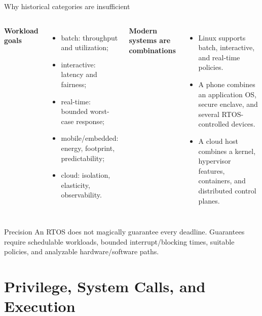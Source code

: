 \documentclass[aspectratio=169,11pt]{beamer}
\begin{document}
\begin{frame}{Why historical categories are insufficient}
  \begin{columns}[T,onlytextwidth]
      \textbf{Workload goals}
      \begin{itemize}
        \item batch: throughput and utilization;
        \item interactive: latency and fairness;
        \item real-time: bounded worst-case response;
        \item mobile/embedded: energy, footprint, predictability;
        \item cloud: isolation, elasticity, observability.
      \end{itemize}
      \textbf{Modern systems are combinations}
      \begin{itemize}
        \item Linux supports batch, interactive, and real-time policies.
        \item A phone combines an application OS, secure enclave, and several RTOS-controlled devices.
        \item A cloud host combines a kernel, hypervisor features, containers, and distributed control planes.
      \end{itemize}
  \end{columns}
  \begin{alertblock}{Precision}
    An RTOS does not magically guarantee every deadline. Guarantees require schedulable workloads, bounded interrupt/blocking times, suitable policies, and analyzable hardware/software paths.
  \end{alertblock}
\end{frame}

\section{Privilege, System Calls, and Execution}
\end{document}
